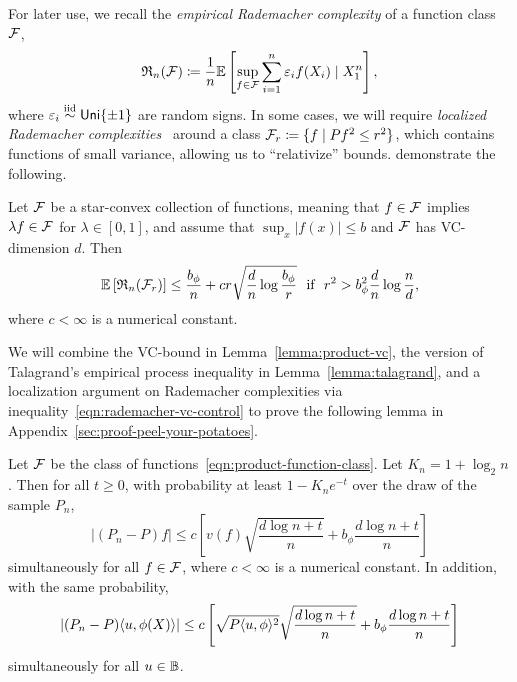 \documentclass{article}
\newcommand{\radphi}{b_{\phi}}
\begin{document}
For later use, we
recall the \emph{empirical Rademacher complexity} of a function class
$\mathcal{F}$,
\begin{equation*}
  \mathfrak{R}_n(\mathcal{F})
  \coloneqq \frac{1}{n} \mathbb{E}\left[\sup_{f \in \mathcal{F}}
    \sum_{i = 1}^n \varepsilon_i f(X_i) \mid X_1^n\right],
\end{equation*}
where $\varepsilon_i \stackrel{\rm iid}{\sim} \mathsf{Uni}\{\pm 1\}$ are random signs.
%
In some cases, we will require \emph{localized Rademacher
complexities}~\cite{BartlettBoMe05, Koltchinskii06a} around
a class $\mathcal{F}_r \coloneqq \{f \mid Pf^2 \le r^2\}$, which
contains functions of small variance, allowing us to ``relativize''
bounds.
%
\citet[Proof of Corollary 3.7]{BartlettBoMe05} demonstrate the following.
\begin{lemma}
  Let $\mathcal{F}$ be a star-convex collection of functions,
  meaning that $f \in \mathcal{F}$ implies $\lambda f \in \mathcal{F}$
  for $\lambda \in [0, 1]$, and assume that $\sup_x |f(x)| \le b$
  and $\mathcal{F}$ has VC-dimension $d$. Then
  \begin{equation}
    \label{eqn:rademacher-vc-control}
    \E\left[\rademacher_n(\mc{F}_r)\right]
    \le \frac{\radphi}{n} + 
    c r \sqrt{\frac{d}{n} \log\frac{\radphi}{r}}
    ~~ \mbox{if}~~
    r^2 > \radphi^2 \frac{d}{n} \log \frac{n}{d},
  \end{equation}
  where $c < \infty$ is a numerical constant.  
\end{lemma}


We will combine the VC-bound in Lemma~\ref{lemma:product-vc},
the version of
Talagrand's empirical process inequality in Lemma~\ref{lemma:talagrand}, and
a localization argument on Rademacher complexities
via inequality~\eqref{eqn:rademacher-vc-control}
to prove the following lemma in Appendix~\ref{sec:proof-peel-your-potatoes}.
\begin{lemma}
  \label{lemma:peel-your-potatoes}
  Let $\mathcal{F}$ be the class of functions~\eqref{eqn:product-function-class}.
  Let $K_n = 1 + \log_2 n$. Then
  for all $t \ge 0$, with probability at least
  $1 - K_n e^{-t}$ over the draw of the sample $P_n$,
  \begin{equation*}
    |(P_n - P) f|
    \le c \left[v(f) \sqrt{\frac{d \log n + t}{n}}
    + \radphi \frac{d \log n + t}{n}\right]
  \end{equation*}
  simultaneously for all $f \in \mathcal{F}$, where $c < \infty$ is a numerical
  constant.
  In addition, with the same probability,
  \begin{equation*}
    \left|(P_n - P)\<u, \phi(X)\>\right|
    \le c \left[\sqrt{P \<u, \phi\>^2}
      \sqrt{\frac{d \log n + t}{n}}
      + \radphi \frac{d \log n + t}{n}
      \right]
  \end{equation*}
  simultaneously for all $u \in \mathbb{B}$.
\end{lemma}
\end{document}
